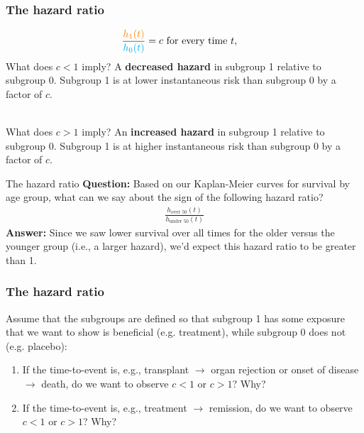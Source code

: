 \documentclass[10pt,t]{beamer}
\begin{document}
\begin{frame}
\frametitle{The hazard ratio}
\begin{align*}
	\frac{\textcolor{orange}{h_1(t)}}{\textcolor{cyan}{h_0(t)}} &= c \text{ for every time } t,
\end{align*}
What does $c < 1$ imply? \pause A \textbf{decreased hazard} in subgroup 1 relative to subgroup 0. Subgroup 1 is at lower instantaneous risk than subgroup 0 by a factor of $c$.\pause 
\\ ~\ 

What does $c > 1$ imply? \pause An \textbf{increased hazard} in subgroup 1 relative to subgroup 0.  Subgroup 1 is at higher instantaneous risk than subgroup 0 by a factor of $c$.
\end{frame}

\begin{frame}{The hazard ratio}
	\textbf{Question:} Based on our Kaplan-Meier curves for survival by age group, what can we say about the sign of the following hazard ratio?
	\begin{align*}
		\frac{h_{\text{over 50}}(t)}{h_{\text{under 50}}(t)}
	\end{align*} \pause 
	\textbf{Answer:} Since we saw lower survival over all times for the older versus the younger group (i.e., a larger hazard), we'd expect this hazard ratio to be greater than 1.
\end{frame}

\begin{frame}
\frametitle{The hazard ratio}
Assume that the subgroups are defined so that subgroup 1 has some exposure that we want to show is beneficial (e.g. treatment), while subgroup 0 does not (e.g. placebo):

\begin{enumerate}
\item If the time-to-event is, e.g., transplant $\rightarrow$ organ rejection or onset of disease $\rightarrow$ death, do we want to observe $c < 1$ or $c > 1$? Why?
\item If the time-to-event is, e.g., treatment $\rightarrow$ remission, do we want to observe $c < 1$ or $c > 1$? Why?
\end{enumerate}
\end{frame}
\end{document}
